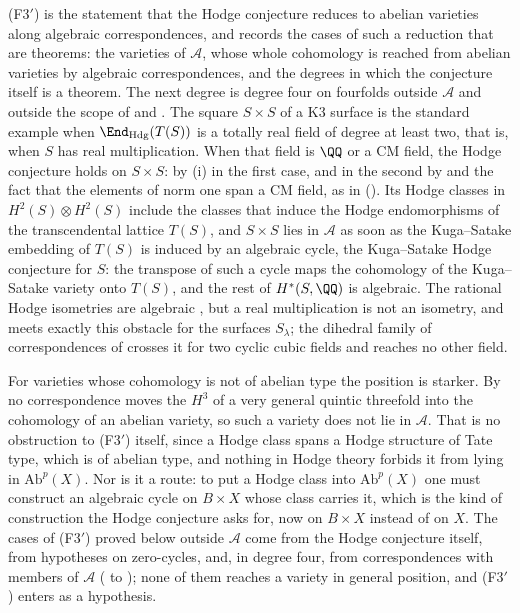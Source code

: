 \begin{remark}\label{rem:f3primeopen}
\textup{(F3$'$)} is the statement that the Hodge conjecture reduces to
abelian varieties along algebraic correspondences, and
 records the cases of such a reduction that are theorems:
the varieties of $\mathcal{A}$, whose whole cohomology is reached from abelian
varieties by algebraic correspondences, and the degrees in which the
conjecture itself is a theorem. The next degree is degree four on fourfolds
outside $\mathcal{A}$ and outside the scope of  and
. The square $S\times S$ of a K3 surface is the standard
example when $\End_{\mathrm{Hdg}}(T(S))$ is a totally real field of degree
at least two, that is, when $S$ has real multiplication. When that field is
$\QQ$ or a CM field, the Hodge conjecture holds on $S\times S$: by
(i) in the first case, and in the second by
\cite{Bus19} and the fact that the elements of norm one span a CM field, as in
\cite{RM08} (). Its Hodge classes in
$H^{2}(S)\otimes H^{2}(S)$ include the classes
that induce the Hodge endomorphisms of the transcendental lattice $T(S)$, and
$S\times S$ lies in $\mathcal{A}$ as soon as the Kuga--Satake embedding of
$T(S)$ is induced by an algebraic cycle, the Kuga--Satake Hodge conjecture for
$S$: the transpose of such a cycle maps the
cohomology of the Kuga--Satake variety onto $T(S)$, and the rest of
$H^{*}(S,\QQ)$ is algebraic. The rational Hodge isometries are algebraic
\cite{Bus19}, but a real multiplication is not an isometry, and
 meets exactly this obstacle for the surfaces
$S_{\lambda}$; the dihedral family of correspondences of \cite{BB26dense} crosses it
for two cyclic cubic fields and reaches no other field.

For varieties whose cohomology is not of abelian type the position is
starker. By  no correspondence moves the $H^{3}$ of a
very general quintic threefold into the cohomology of an abelian variety, so
such a variety does not lie in $\mathcal{A}$. That is no obstruction to
\textup{(F3$'$)} itself, since a Hodge class spans a Hodge structure of Tate
type, which is of abelian type, and nothing in Hodge theory forbids it from
lying in $\mathrm{Ab}^{p}(X)$. Nor is it a route: to put a Hodge class into
$\mathrm{Ab}^{p}(X)$ one must construct an algebraic cycle on $B\times X$
whose class carries it, which is the kind of construction the Hodge
conjecture asks for, now on $B\times X$ instead of on $X$. The cases of
\textup{(F3$'$)} proved below outside $\mathcal{A}$ come from the Hodge
conjecture itself, from hypotheses on zero-cycles, and, in degree four, from
correspondences with members of $\mathcal{A}$
( to ); none of them reaches a
variety in general position, and \textup{(F3$'$)} enters  as
a hypothesis.
\end{remark}

